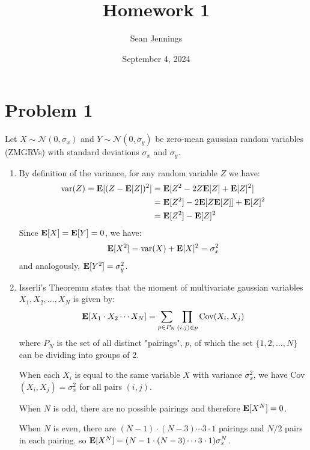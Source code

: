 \documentclass{homework}
\title{Homework 1}
\author{Sean Jennings}
\date{September 4, 2024}
\begin{document}
\maketitle

\newcommand{\normal}{\mathcal{N}}
\newcommand{\E}{{\bf E}}
\newcommand{\var}{\text{var}}
\renewcommand{\vec}[1]{{\bf #1}}


\section{Problem 1}
Let $X \sim \normal(0, \sigma_x)$ and $Y \sim \normal(0, \sigma_y)$ be
zero-mean gaussian random variables (ZMGRVs) with standard deviations $\sigma_x$
and $\sigma_y$.

\begin{enumerate}[label=\roman*)]
\item By definition of the variance, for any random variable $Z$ we have:
\begin{align*}
    \text{var}(Z) = \E[(Z - \E[Z])^2] &= \E[Z^2 - 2 Z \E[Z] + \E[Z]^2] \\
        &= \E[Z^2] - 2 \E[Z \E[Z]] + \E[Z]^2 \\
        &= \E[Z^2] - \E[Z]^2
\end{align*}
Since $\E[X] = \E[Y] = 0$, we have:
\begin{equation*}
    \E[X^2] = \var(X) + \E[X]^2 = \sigma_x^2
\end{equation*}
and analogously, $\E[Y^2] = \sigma_y^2$.

\item Isserli's Theoremm states that the moment of multivariate gaussian
variables $X_1,X_2,\dots,X_N$ is given by:
\begin{equation*}
    \E[X_1 \cdot X_2 \cdots X_N] =
        \sum_{p\in P_N} \prod_{(i,j) \in p} \text{Cov}(X_i, X_j)
\end{equation*}
where $P_N$ is the set of all distinct "pairings", $p$, of which the set
$\{1, 2, \dots, N\}$ can be dividing into groups of 2.

When each $X_i$ is equal to the same variable $X$ with variance $\sigma_x^2$,
we have Cov$(X_i, X_j) = \sigma_x^2$ for all pairs $(i,j)$.

When $N$ is odd, there are no possible pairings and therefore $\E[X^N] = 0$.

When $N$ is even, there are $(N-1) \cdot (N-3) \cdots 3 \cdot 1$ pairings
and $N/2$ pairs in each pairing.
so $\E[X^N] = (N-1 \cdot (N-3) \cdots 3 \cdot 1) \sigma_x^N$.


\end{enumerate}
\end{document}
